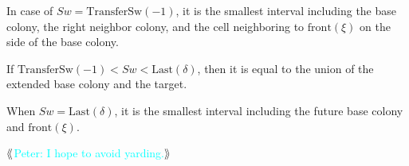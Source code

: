 \documentclass[12pt]{memoir}
\newcommand{\authnote}[3]
{{ \textcolor{#3}{$\langle\hspace{-0.2em}\langle$\textsf{\footnotesize #1: #2}$\rangle\hspace{-0.2em}\rangle$}}}
\newcommand{\authnote}[2]{}
\newcommand{\Pnote}[1]{{\authnote{Peter}{#1}{cyan}}}
\newcommand{\fld}[1]{\ensuremath{\textit{#1}}}
\def\B{B}
\newcommand{\cKind}{\fld{cKind}}
\newcommand{\Sweep}{\fld{Sw}}
\newcommand{\front}{\mathrm{front}}
\newcommand{\Last}{\mathrm{Last}}
\newcommand{\Member}{\mathrm{Member}}
\newcommand{\TransferSw}{\mathrm{TransferSw}}
\begin{document}
\begin{definition}
\begin{flushdescription}
\begin{bullets}
            \item In case of \( \Sweep = \TransferSw(-1) \),
                  it is the smallest interval including
                  the base colony, the right neighbor colony,
                  and the cell neighboring to
                  \( \front(\xi) \) on the side of the base colony.

            \item If \( \TransferSw(-1) < \Sweep < \Last(\delta) \),
                  then it is equal to the union of the extended base colony and the target.
            \item When \( \Sweep = \Last(\delta) \), it is
                  the smallest interval including the future
                  base colony and \( \front(\xi) \).
        \end{bullets}


\Pnote{I hope to avoid yarding.}










\end{flushdescription}
\end{definition}
\end{document}
